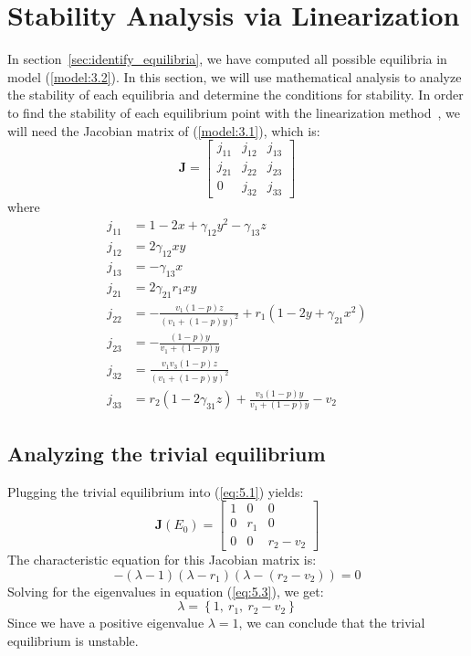 \section{Stability Analysis via Linearization}\label{sec:stability_analysis}
In section~\ref{sec:identify_equilibria}, we have computed all possible equilibria in model (\ref{model:3.2}). In this section, we will use mathematical analysis to analyze the stability of each equilibria and determine the conditions for stability. In order to find the stability of each equilibrium point with the linearization method~\cite{book:2478639}, we will need the Jacobian matrix of (\ref{model:3.1}), which is:
\begin{equation}
    \textbf{J}=\begin{bmatrix}
        j_{11} & j_{12} & j_{13}\\
        j_{21} & j_{22} & j_{23}\\
        0 & j_{32} & j_{33}
    \end{bmatrix}
    \label{eq:5.1}
\end{equation}
where
\begin{align*}
    j_{11} &= 1-2x+\gamma_{12}y^2-\gamma_{13}z\\
    j_{12} &= 2\gamma_{12}xy\\
    j_{13} &= -\gamma_{13}x\\
    j_{21} &= 2\gamma_{21}r_1xy\\
    j_{22} &= -\frac{v_1\left(1-p\right)z}{\left(v_1+\left(1-p\right)y\right)^2}+r_1\left(1-2y+\gamma_{21}x^2\right)\\
    j_{23} &= -\frac{\left(1-p\right)y}{v_1+\left(1-p\right)y}\\
    j_{32} &= \frac{v_1v_3\left(1-p\right)z}{\left(v_1+\left(1-p\right)y\right)^2}\\
    j_{33} &= r_2\left(1-2\gamma_{31}z\right)+\frac{v_3\left(1-p\right)y}{v_1+\left(1-p\right)y}-v_2
\end{align*}

\subsection{Analyzing the trivial equilibrium}\label{subsec:stability_trivial_equilibrium}
Plugging the trivial equilibrium into (\ref{eq:5.1}) yields:
\begin{equation}
    \textbf{J}\left(E_0\right)=\begin{bmatrix}
        1 & 0 & 0\\
        0 & r_1 & 0\\
        0 & 0 & r_2-v_2
    \end{bmatrix}
    \label{eq:5.2}
\end{equation}
The characteristic equation for this Jacobian matrix is:
\begin{equation}
    -\left(\lambda-1\right)\left(\lambda-r_1\right)\left(\lambda-\left(r_2-v_2\right)\right)=0
    \label{eq:5.3}
\end{equation}
Solving for the eigenvalues in equation (\ref{eq:5.3}), we get:
\[
\lambda=\left\{
1,\
r_1,\
r_2-v_2
\right\}
\]
Since we have a positive eigenvalue $\lambda=1$, we can conclude that the trivial equilibrium is unstable.

